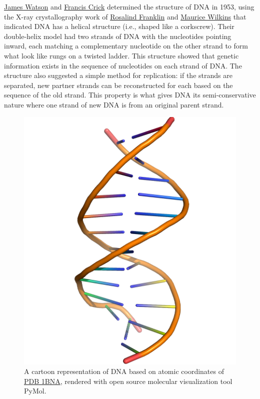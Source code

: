 \href{https://en.wikipedia.org/wiki/James_Watson}{James Watson} and \href{https://en.wikipedia.org/wiki/Francis_Crick}{Francis Crick} determined the structure of DNA in 1953, using the X-ray crystallography work of \href{https://en.wikipedia.org/wiki/Rosalind_Franklin}{Rosalind Franklin} and \href{https://en.wikipedia.org/wiki/Maurice_Wilkins}{Maurice Wilkins} that indicated DNA has a helical structure (i.e., shaped like a corkscrew). Their double-helix model had two strands of DNA with the nucleotides pointing inward, each matching a complementary nucleotide on the other strand to form what look like rungs on a twisted ladder. This structure showed that genetic information exists in the sequence of nucleotides on each strand of DNA. The structure also suggested a simple method for replication: if the strands are separated, new partner strands can be reconstructed for each based on the sequence of the old strand. This property is what gives DNA its semi-conservative nature where one strand of new DNA is from an original parent strand.



\begin{figure}

{\centering \includegraphics[width=0.7\linewidth]{./figures/molecular_biology/DNA_cartoon} 

}

\caption{A cartoon representation of DNA based on atomic coordinates of \href{https://www.rcsb.org/structure/1bna}{PDB 1BNA}, rendered with open source molecular visualization tool PyMol.}\label{fig:dnacartoon}
\end{figure}


